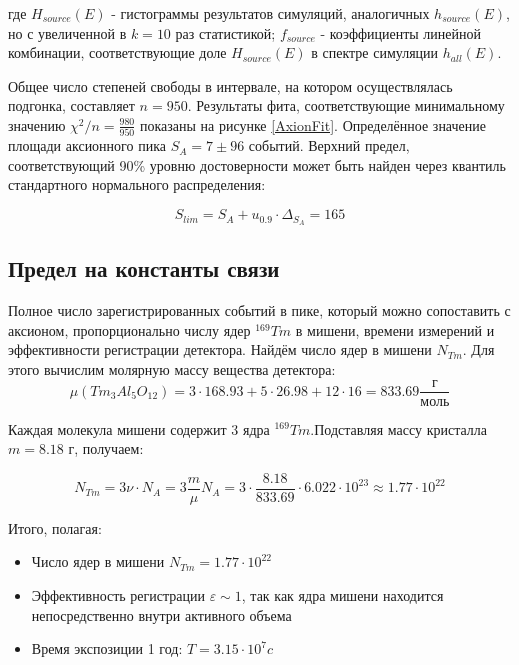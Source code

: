 \documentclass[a4paper,article,14pt]{extarticle}
\begin{document}
где $H_{source}\left( E \right)$ - гистограммы результатов симуляций, аналогичных $h_{source}\left( E \right)$, но с увеличенной в $k=10$ раз статистикой; $f_{source}$ - коэффициенты линейной комбинации, соответствующие доле $H_{source}\left( E \right)$ в спектре симуляции $h_{all} \left( E \right)$.

Общее число степеней свободы в интервале, на котором осуществлялась подгонка, составляет $n = 950$. Результаты фита, соответствующие минимальному значению $\chi^2 /n = \frac{980}{950}$ показаны на рисунке \ref{AxionFit}. Определённое значение площади аксионного пика $S_A = 7 \pm 96 $ событий. Верхний предел, соответствующий 90\% уровню достоверности может быть найден через квантиль стандартного нормального распределения:

\begin{equation}
    S_{lim} = S_A + u_{0.9} \cdot \Delta_{S_A} = 165
\end{equation}

\subsection{Предел на константы связи}
Полное число зарегистрированных событий в пике, который можно сопоставить с аксионом, пропорционально числу ядер $^{169}Tm$ в мишени, времени измерений и эффективности регистрации детектора. Найдём число ядер в мишени ${N_{Tm}}$. Для этого вычислим молярную массу вещества детектора:
\begin{equation}
    \mu \left( {T{m_3}A{l_5}{O_{12}}} \right) = 3 \cdot 168.93 + 5 \cdot 26.98 + 12 \cdot 16 = 833.69\frac{\text{г}}{{\text{моль}}}
\end{equation}

Каждая молекула мишени содержит 3 ядра $^{169}Tm$.Подставляя массу кристалла $m= 8.18 \text{ г}$, получаем:

\begin{equation}
    {N_{Tm}} = 3\nu  \cdot {N_A} = 3\frac{m}{\mu }{N_A} = 3 \cdot \frac{{8.18}}{{833.69}} \cdot 6.022 \cdot {10^{23}} \approx 1.77 \cdot {10^{22}}
\end{equation}

Итого, полагая:
\begin{itemize}
    \item Число ядер в мишени $N_{Tm} = 1.77 \cdot {10^{22}}$
    \item Эффективность регистрации $\varepsilon \sim 1 $, так как ядра мишени находится непосредственно внутри активного объема
    \item Время экспозиции 1 год: $T = 3.15 \cdot {10^7} c$
\end{itemize}
\end{document}
